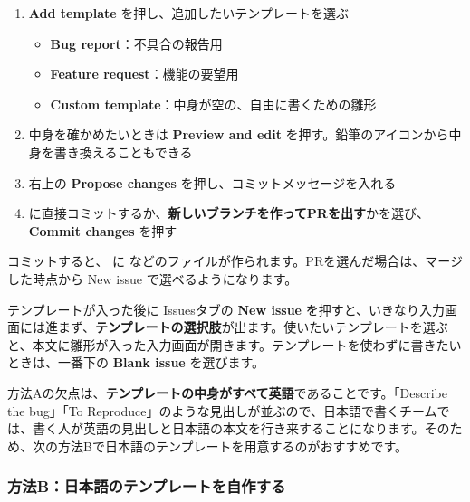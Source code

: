 \begin{enumerate}[leftmargin=1.6em, start=3]
  \item \textbf{Add template} を押し、追加したいテンプレートを選ぶ
  \begin{itemize}[leftmargin=1.4em, nosep]
    \item \textbf{Bug report}：不具合の報告用
    \item \textbf{Feature request}：機能の要望用
    \item \textbf{Custom template}：中身が空の、自由に書くための雛形
  \end{itemize}
  \item 中身を確かめたいときは \textbf{Preview and edit} を押す。鉛筆のアイコンから中身を書き換えることもできる
  \item 右上の \textbf{Propose changes} を押し、コミットメッセージを入れる
  \item {} に直接コミットするか、\textbf{新しいブランチを作ってPRを出す}かを選び、\textbf{Commit changes} を押す
\end{enumerate}

コミットすると、 に  などのファイルが作られます。PRを選んだ場合は、マージした時点から New issue で選べるようになります。

テンプレートが入った後に Issuesタブの \textbf{New issue} を押すと、いきなり入力画面には進まず、\textbf{テンプレートの選択肢}が出ます。使いたいテンプレートを選ぶと、本文に雛形が入った入力画面が開きます。テンプレートを使わずに書きたいときは、一番下の \textbf{Blank issue} を選びます。


方法Aの欠点は、\textbf{テンプレートの中身がすべて英語}であることです。「Describe the bug」「To Reproduce」のような見出しが並ぶので、日本語で書くチームでは、書く人が英語の見出しと日本語の本文を行き来することになります。そのため、次の方法Bで日本語のテンプレートを用意するのがおすすめです。

\subsubsection{方法B：日本語のテンプレートを自作する}

